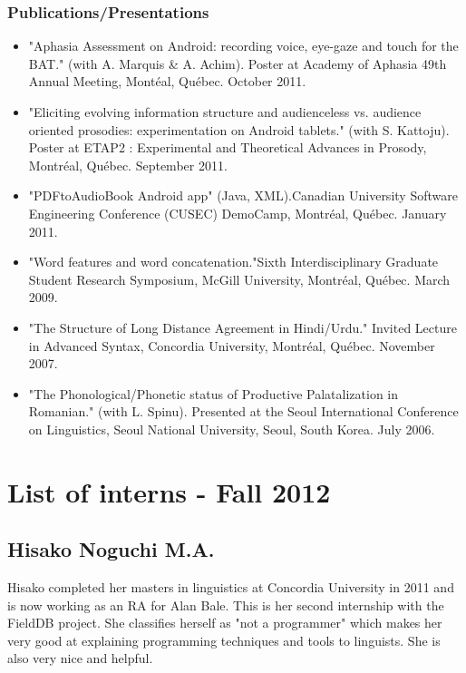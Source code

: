 \documentclass[12 pt]{article}
\begin{document}
\subsubsection{Publications/Presentations}
\begin{itemize}

\item "Aphasia Assessment on Android: recording voice, eye-gaze and touch for the BAT." (with A. Marquis \& A. Achim). Poster at Academy of Aphasia 49th Annual Meeting, Mont\'eal, Qu\'ebec. October 2011.
\item "Eliciting evolving information structure and audienceless vs. audience oriented prosodies: experimentation on Android tablets." (with S. Kattoju). Poster at ETAP2 : Experimental and Theoretical Advances in Prosody, Montr\'eal, Qu\'ebec. September 2011.
\item "PDFtoAudioBook Android app" (Java, XML).Canadian University Software Engineering Conference (CUSEC) DemoCamp, Montr\'eal, Qu\'ebec. January 2011.
\item "Word features and word concatenation."Sixth Interdisciplinary Graduate Student Research Symposium, McGill University, Montr\'eal, Qu\'ebec. March 2009.
\item "The Structure of Long Distance Agreement in Hindi/Urdu." Invited Lecture in Advanced Syntax, Concordia University, Montr\'eal, Qu\'ebec. November 2007.
\item "The Phonological/Phonetic status of Productive Palatalization in Romanian." (with L. Spinu). Presented at the Seoul International Conference on Linguistics, Seoul National University, Seoul, South Korea. July 2006.
\end{itemize}


\section {List of interns - Fall 2012}


\subsection{Hisako Noguchi M.A.}

Hisako completed her masters in linguistics at Concordia University in 2011 and is now working as an RA for Alan Bale. This is her second internship with the FieldDB project. She classifies herself as "not a programmer" which makes her very good at explaining programming techniques and tools to linguists. She is also very nice and helpful.
\end{document}

